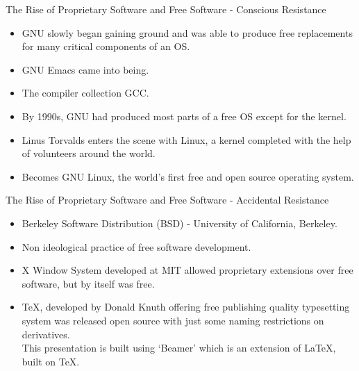 \documentclass{beamer}
\begin{document}
\begin{frame}{The Rise of Proprietary Software and Free Software - Conscious Resistance}
\begin{itemize}
	\item GNU slowly began gaining ground and was able to produce free replacements for many critical components of an OS. 
	\item GNU Emacs came into being. 
	\item The compiler collection GCC. 
	\item By 1990s, GNU had produced most parts of a free OS except for the kernel. 
	\item Linus Torvalds enters the scene with Linux, a kernel completed with the help of volunteers around the world. 
	\item Becomes GNU Linux, the world's first free and open source operating system.
\end{itemize}
\end{frame}

\begin{frame}{The Rise of Proprietary Software and Free Software - Accidental Resistance}
\begin{itemize}
	\item Berkeley Software Distribution (BSD) - University of California, Berkeley. 
	\item Non ideological practice of free software development. 
	\item X Window System developed at MIT allowed proprietary extensions over free software, but by itself was free. 
	\item \TeX , developed by Donald Knuth offering free publishing quality typesetting system was released open source with just some naming restrictions on derivatives. 
	\vspace{0.4cm} \\This presentation is built using `Beamer' which is an extension of \LaTeX , built on \TeX.
\end{itemize}
\end{frame}
\end{document}
